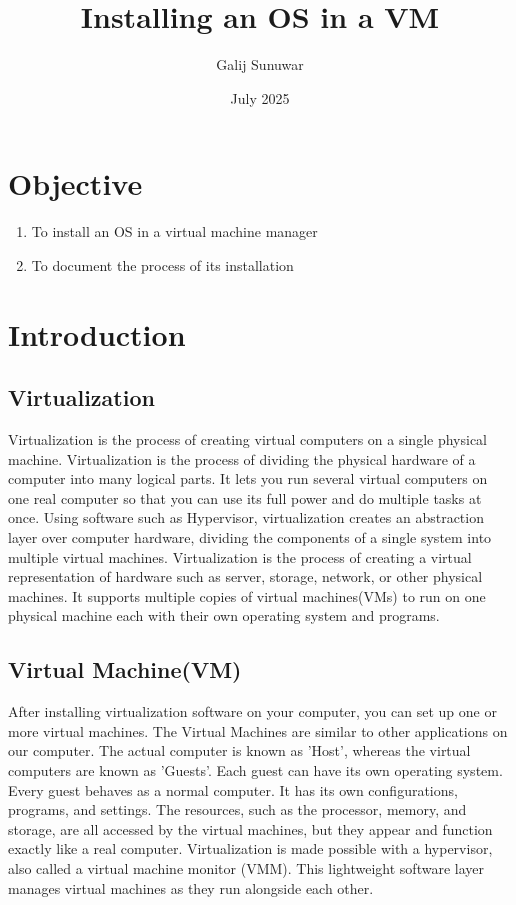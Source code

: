 \documentclass[a4paper,12pt]{report}
\title{\textbf{Installing an OS in a VM}}
\author{Galij Sunuwar}
\date{July 2025}
\begin{document}
\maketitle

 \tableofcontents
 \newpage

\section {Objective}
\begin{enumerate}
\item To install an OS in a virtual machine manager
\item To document the process of its installation
\end{enumerate}
\section{Introduction}
    \subsection{Virtualization} Virtualization is the process of creating virtual computers on a single physical machine.
    Virtualization is the process of dividing the physical hardware of a computer into many logical parts.
    \newline
    It lets you run several virtual computers on one real computer so that you can use its full power and do multiple tasks at once. 
    Using software such as Hypervisor, virtualization creates an abstraction layer over computer hardware, dividing the components of a single system into multiple virtual machines.
    \newline
    Virtualization is the process of creating a virtual representation of hardware such as server, storage, network, or other physical machines. It supports multiple copies of virtual machines(VMs) to run on one physical machine each with their own operating system and programs.
\subsection{Virtual Machine(VM)}
    After installing virtualization software on your computer, you can set up one or more virtual machines. The Virtual Machines are similar to other applications on our computer. The actual computer is known as 'Host', whereas the virtual computers are known as 'Guests'.
    \newline
    Each guest can have its own operating system. Every guest behaves as a normal computer. It has its own configurations, programs, and settings. The resources, such as the processor, memory, and storage, are all accessed by the virtual machines, but they appear and function exactly like a real computer.
    \newline
    Virtualization is made possible with a hypervisor, also called a virtual machine monitor (VMM). This lightweight software layer manages virtual machines as they run alongside each other.
\newpage
\end{document}
